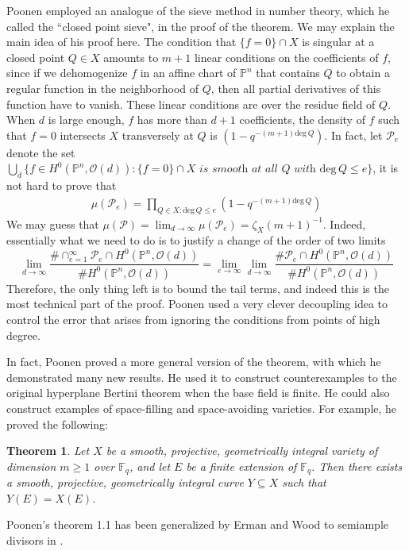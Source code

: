 \documentclass[12pt]{article}
\theoremstyle{plain}
\newtheorem{theorem}[equation]{Theorem}
\theoremstyle{definition}
\newcommand{\IF}{\mathbb{F}}
\newcommand{\IP}{\mathbb{P}}
\newcommand{\sO}{\mathcal{O}}
\newcommand{\sP}{\mathcal{P}}
\renewcommand{\deg}{\mathrm{deg}\,}
\newcommand\union{\bigcup}
\newcommand{\<}{\langle}
\renewcommand{\>}{\rangle}
\begin{document}
Poonen employed an analogue of the sieve method in number theory, which he called the ``closed point sieve", in the proof of the theorem. We may explain the main idea of his proof here. The condition that $\{ f = 0 \} \cap X$ is singular at a closed point $Q \in X$ amounts to $m + 1$ linear conditions on the coefficients of $f$, since if we dehomogenize $f$ in an affine chart of $\IP^n$ that contains $Q$ to obtain a regular function in the neighborhood of $Q$, then all partial derivatives of this function have to vanish. These linear conditions are over the residue field of $Q$. When $d$ is large enough, $f$ has more than $d + 1$ coefficients, the density of $f$ such that $f = 0$ intersects $X$ transversely at $Q$ is $(1 - q^{-(m + 1) \deg Q})$. In fact, let $\sP_{e}$ denote the set $\union_d \{ f \in H^0(\IP^n, \sO(d)) : \{f=0\} \cap X \textit{ is smooth at all }Q \textit{ with } \deg Q \le e \}$, it is not hard to prove that 
\begin{align*}
\mu(\sP_e) = \prod_{Q \in X : \deg Q \le e} (1 - q^{-(m + 1) \deg Q})
\end{align*}  
We may guess that $\mu(\sP) = \lim_{d \to \infty} \mu(\sP_e) = \zeta_X(m + 1)^{-1}$. Indeed, essentially what we need to do is to justify a change of the order of two limits
$$ \lim_{d \to \infty} \frac{\# \cap_{e = 1}^\infty \sP_e \cap H^0(\IP^n, \sO(d))}{\# H^0(\IP^n, \sO(d))} = \lim_{e \to \infty} \lim_{d \to \infty} \frac{\# \sP_e \cap H^0(\IP^n, \sO(d))}{\# H^0(\IP^n, \sO(d))}$$
Therefore, the only thing left is to bound the tail terms, and indeed this is the most technical part of the proof. Poonen used a very clever decoupling idea to control the error that arises from ignoring the conditions from points of high degree. 


In fact, Poonen proved a more general version of the theorem, with which he demonstrated many new results. He used it to construct counterexamples to the original hyperplane Bertini theorem when the base field is finite. He could also construct examples of space-filling and space-avoiding varieties. For example, he proved the following:

\begin{theorem}
Let $X$ be a smooth, projective, geometrically integral variety of dimension $m \ge 1$ over $\IF_q$, and let $E$ be a finite extension of $\IF_q$. Then there exists
a smooth, projective, geometrically integral curve $Y \subseteq X$ such that $Y(E) = X(E)$.
\end{theorem}

Poonen's theorem 1.1 has been generalized by Erman and Wood to semiample divisors in \cite{Wood}.  
\end{document}
